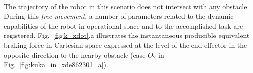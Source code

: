 \documentclass[letterpaper, 10 pt, conference]{ieeeconf}      %
\begin{document}
\\
The trajectory of the robot in this scenario does not intersect with any obstacle. During this \textit{free movement}, a number of parameters related to the dynamic capabilities of the robot in operational space and to the accomplished task are registered. Fig.~\ref{fig:k_xdot}.a illustrates the instantaneous producible equivalent braking force in Cartesian space expressed at the level of the end-effector in the opposite direction to the nearby obstacle (case $O_2$ in Fig.~\ref{fig:kuka_in_xde862301_a}). 
\end{document}
